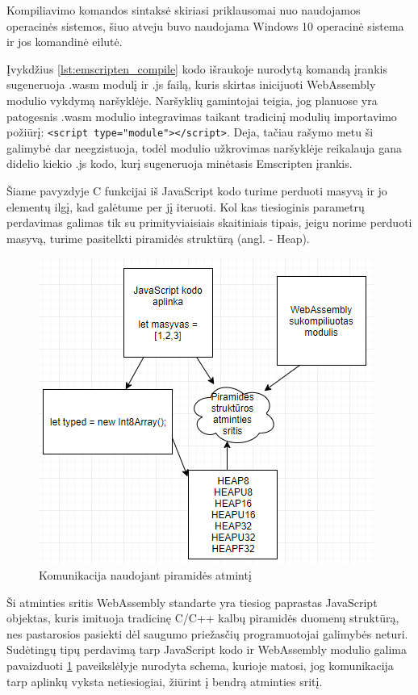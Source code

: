 \documentclass{VUMIFPSkursinis}
\begin{document}
Kompiliavimo komandos sintaksė skiriasi priklausomai nuo naudojamos operacinės sistemos, šiuo atveju buvo naudojama Windows 10 operacinė sistema ir jos komandinė eilutė.

Įvykdžius \ref{lst:emscripten_compile} kodo išraukoje nurodytą komandą įrankis sugeneruoja .wasm modulį ir .js failą, kuris skirtas inicijuoti WebAssembly modulio vykdymą naršyklėje. Naršyklių gamintojai teigia, jog planuose yra patogesnis .wasm modulio integravimas taikant tradicinį modulių importavimo požiūrį: \lstinline[columns=fixed]{<script type="module"></script>}. Deja, tačiau rašymo metu ši galimybė dar neegzistuoja, todėl modulio užkrovimas naršyklėje reikalauja gana didelio kiekio .js kodo, kurį sugeneruoja minėtasis Emscripten įrankis.

Šiame pavyzdyje C funkcijai iš JavaScript kodo turime perduoti masyvą ir jo elementų ilgį, kad galėtume per jį iteruoti. Kol kas tiesioginis parametrų perdavimas galimas tik su primityviaisiais skaitiniais tipais, jeigu norime perduoti masyvą, turime pasitelkti piramidės struktūrą (angl. - Heap). 
\begin{figure}[h!]
  \begin{center}
  \includegraphics[scale=0.7]{wasm_heap.png}
  \end{center}
  \caption{Komunikacija naudojant piramidės atmintį}
  \label{fig:wasm_stack}
\end{figure}
Ši atminties sritis WebAssembly standarte yra tiesiog paprastas JavaScript objektas, kuris imituoja tradicinę C/C++ kalbų piramidės duomenų struktūrą, nes pastarosios pasiekti dėl saugumo priežasčių programuotojai galimybės neturi. 
Sudėtingų tipų perdavimą tarp JavaScript kodo ir WebAssembly modulio galima pavaizduoti \ref{fig:wasm_stack} paveikslėlyje nurodyta schema, kurioje matosi, jog komunikacija tarp aplinkų vyksta netiesiogiai, žiūrint į bendrą atminties sritį.
\end{document}
